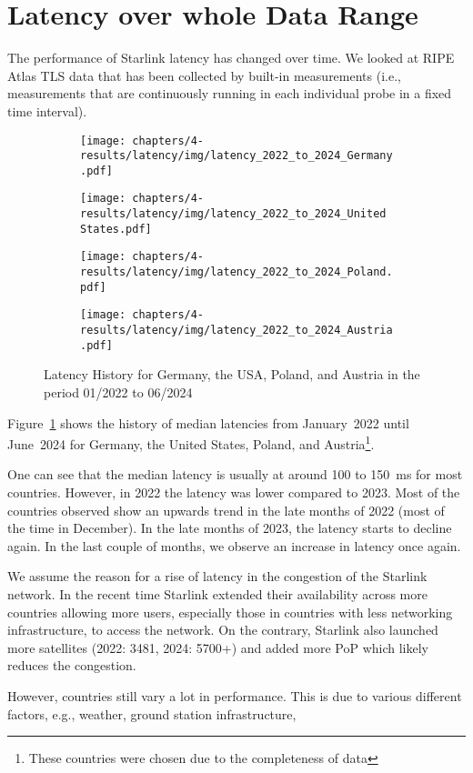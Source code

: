 \section{Latency over whole Data Range} \label{sec:latency-wholerange}

The performance of Starlink latency has changed over time. We looked at RIPE Atlas TLS data that has been collected by built-in measurements (i.e., measurements that are continuously running in each individual probe in a fixed time interval).

\begin{figure}
	\centering
	\begin{subfigure}[b]{0.47\textwidth}
		\centering
		\texttt{[image: chapters/4-results/latency/img/latency\_2022\_to\_2024\_Germany.pdf]}
	\end{subfigure}
	\begin{subfigure}[b]{0.47\textwidth}
		\centering
		\texttt{[image: chapters/4-results/latency/img/latency\_2022\_to\_2024\_United States.pdf]}
	\end{subfigure}
	\begin{subfigure}[b]{0.47\textwidth}
		\centering
		\texttt{[image: chapters/4-results/latency/img/latency\_2022\_to\_2024\_Poland.pdf]}
	\end{subfigure}
	\begin{subfigure}[b]{0.47\textwidth}
		\centering
		\texttt{[image: chapters/4-results/latency/img/latency\_2022\_to\_2024\_Austria.pdf]}
	\end{subfigure}
	\caption{Latency History for Germany, the USA, Poland, and Austria in the period 01/2022 to 06/2024}
	\label{fig:latency_wholerange}
\end{figure}

Figure~\ref{fig:latency_wholerange} shows the history of median latencies from January~2022 until June~2024 for Germany, the United States, Poland, and Austria\footnote{These countries were chosen due to the completeness of data}.

One can see that the median latency is usually at around 100 to 150~ms for most countries. However, in 2022 the latency was lower compared to 2023. Most of the countries observed show an upwards trend in the late months of 2022 (most of the time in December). In the late months of 2023, the latency starts to decline again. In the last couple of months, we observe an increase in latency once again.

We assume the reason for a rise of latency in the congestion of the Starlink network. In the recent time Starlink extended their availability across more countries allowing more users, especially those in countries with less networking infrastructure, to access the network.
On the contrary, Starlink also launched more satellites (2022: 3481, 2024: 5700+) and added more \ac{PoP} which likely reduces the congestion.

However, countries still vary a lot in performance. This is due to various different factors, e.g., weather, ground station infrastructure,
